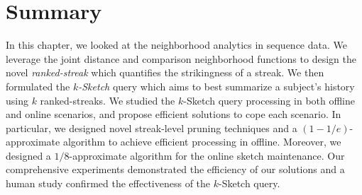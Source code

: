 \section{Summary} \label{sec:conclusion}
In this chapter, we looked at the neighborhood analytics in
sequence data. We leverage the joint distance and comparison neighborhood 
functions to design the novel \emph{ranked-streak} which quantifies the strikingness of
a streak. We then formulated the \emph{$k$-Sketch} query which aims to best summarize a subject's history using $k$ ranked-streaks.
We studied the $k$-Sketch query processing in both offline and online scenarios,
and propose efficient solutions to cope each scenario. 
In particular, we designed novel streak-level pruning techniques and a $(1-1/e)$-approximate algorithm to achieve efficient processing in offline. Moreover, we designed a $1/8$-approximate algorithm for the online sketch maintenance.
Our comprehensive experiments demonstrated the efficiency of our solutions and a human study confirmed the effectiveness of the $k$-Sketch query.


